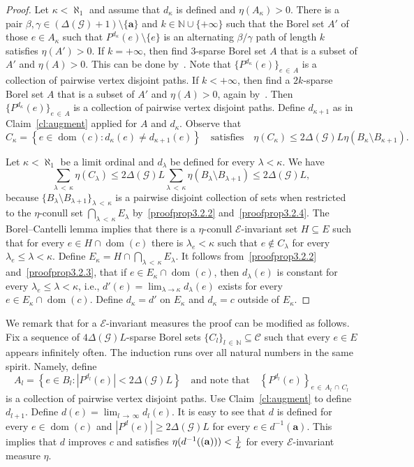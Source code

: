 \documentclass[10pt]{amsart}
\theoremstyle{definition}
\DeclareMathOperator{\dom}{dom}
\newcommand{\bfa}{\mathbf{a}}
\newcommand{\clG}{\mathcal{G}}
\newcommand{\clE}{\mathcal{E}}
\newcommand{\clC}{\mathcal{C}}
\newcommand{\bbZ}{\mathbb{N}}
\begin{document}
\begin{proof}
Let $\kappa<\aleph_1$ and assume that $d_\kappa$ is defined and $\eta(A_\kappa)>0$. There is a pair $\beta,\gamma\in (\Delta(\clG)+1)\setminus \{\bfa\}$ and $k\in \bbZ\cup \{+\infty\}$ such that the Borel set $A'$ of those $e\in A_\kappa$ such that $P^{d_\kappa}(e)\setminus \{e\}$ is an alternating $\beta/\gamma$ path of length $k$ satisfies $\eta(A')>0$. If $k=+\infty$, then find $3$-sparse Borel set $A$ that is a subset of $A'$ and $\eta(A)>0$. This can be done by~\cite[Proposition~4.6]{KST}. Note that $\{P^{d_\kappa}(e)\}_{e\,\in\,A}$ is a collection of pairwise vertex disjoint paths. If $k<+\infty$, then find a $2k$-sparse Borel set $A$ that is a subset of $A'$ and $\eta(A)>0$, again by~\cite[Proposition~4.6]{KST}. Then $\{P^{d_\kappa}(e)\}_{e\,\in\,A}$ is a collection of pairwise vertex disjoint paths. Define $d_{\kappa+1}$ as in Claim~\ref{cl:augment} applied for $A$ and $d_\kappa$. Observe that
\[
C_\kappa=\left\{e\in \dom(c): d_{\kappa}(e)\not=d_{\kappa+1}(e)\right\}\quad\text{satisfies}\quad\eta(C_\kappa)\le 2\Delta(\clG) L\eta\left(B_\kappa\setminus B_{\kappa+1}\right).
\]

Let $\kappa<\aleph_1$ be a limit ordinal and $d_\lambda$ be defined for every $\lambda<\kappa$. We have
\[
\sum_{\lambda\,<\,\kappa}\eta(C_\lambda)\le 2\Delta(\clG) L\sum_{\lambda\,<\,\kappa}\eta\left(B_\lambda\setminus B_{\lambda+1}\right)\le 2\Delta(\clG) L,
\]
because $\{B_\lambda\setminus B_{\lambda+1}\}_{\lambda\,<\,\kappa}$ is a pairwise disjoint collection of sets when restricted to the $\eta$-conull set $\bigcap_{\lambda\,<\,\kappa}E_\lambda$ by~\eqref{proofprop3.2.2} and~\eqref{proofprop3.2.4}. The Borel--Cantelli lemma implies that there is a $\eta$-conull $\clE$-invariant set $H\subseteq E$ such that for every $e\in H\cap \dom(c)$ there is $\lambda_e<\kappa$ such that $e\not \in C_\lambda$ for every $\lambda_e\le \lambda<\kappa$. Define $E_\kappa=H\cap \bigcap_{\lambda\,<\,\kappa} E_{\lambda}$. It follows from~\eqref{proofprop3.2.2} and~\eqref{proofprop3.2.3}, that if $e\in E_\kappa\cap \dom(c)$, then $d_\lambda(e)$ is constant for every $\lambda_e\le \lambda <\kappa$, i.e., $d'(e)=\lim_{\lambda\to \kappa}d_{\lambda}(e)$ exists for every $e\in E_\kappa\cap \dom(c)$. Define $d_\kappa=d'$ on $E_\kappa$ and $d_\kappa=c$ outside of $E_\kappa$.
\end{proof}

We remark that for a $\clE$-invariant measures the proof can be modified as follows. Fix a sequence of $4\Delta(\clG)L$-sparse Borel sets $\{C_l\}_{l\,\in\,\bbZ}\subseteq \clC$ such that every $e\in E$ appears infinitely often. The induction runs over all natural numbers in the same spirit. Namely, define
\[
A_l=\left\{e\in B_l: \left|P^{d_l}(e)\right|<2\Delta(\clG)L\right\}\quad \text{and note that} \quad\left\{P^{d_l}(e)\right\}_{e\,\in\,A_l\,\cap\,C_l}
\]
is a collection of pairwise vertex disjoint paths. Use Claim~\ref{cl:augment} to define $d_{l+1}$. Define $d(e)=\lim_{l\,\to\,\infty} d_l(e)$. It is easy to see that $d$ is defined for every $e\in \dom(c)$ and $|P^d(e)|\ge 2\Delta(\clG)L$ for every $e\in d^{-1}(\bfa)$. This implies that $d$ improves $c$ and satisfies $\eta(d^{-1}({\bf(a)}))<\frac{1}{L}$ for every $\clE$-invariant measure $\eta$.
\end{document}
